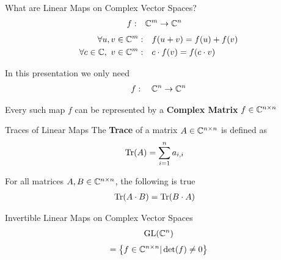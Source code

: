 \begin{frame}{What are Linear Maps on Complex Vector Spaces?}
    \Large
    \begin{align*}
        f: \quad & \mathbb{C}^m \to \mathbb{C}^n
    \end{align*}
    \large
    \pause
    \begin{align*}
        \forall u, v \in \mathbb{C}^m: \quad & f(u + v) = f(u) + f(v) \\
        \forall c \in \mathbb{C},\ v \in \mathbb{C}^m: \quad & c \cdot f(v) = f(c \cdot v)
    \end{align*}
    
    \pause
    In this presentation we only need
    \Large
    \begin{align*}
        f: \quad \mathbb{C}^n \to \mathbb{C}^n
    \end{align*}

    \large
    \pause
    Every such map $f$ can be represented by a \textbf{Complex Matrix} $f \in \mathbb{C}^{n \times n}$
    \vspace{2em}
\end{frame}

\begin{frame}{Traces of Linear Maps}
    The \textbf{Trace} of a matrix $A \in \mathbb{C}^{n \times n}$ is defined as
    \pause
    \begin{align*}
        \operatorname{Tr}(A) & = \sum_{i = 1}^n a_{i, i}
    \end{align*}
    
    \pause
    For all matrices $A, B \in \mathbb{C}^{n \times n}$, the following is true
    \begin{align*}
        \operatorname{Tr}(A \cdot B) & = \operatorname{Tr}(B \cdot A)
    \end{align*}
\end{frame}

\begin{frame}{Invertible Linear Maps on Complex Vector Spaces}
    \huge
    \begin{align*}
        \operatorname{GL}(\mathbb{C}^n)
    \end{align*}
    \pause
    \large
    \begin{align*}
        = \left\{
            f \in \mathbb{C}^{n \times n} | \det(f) \neq 0
        \right\}
    \end{align*}

\end{frame}
